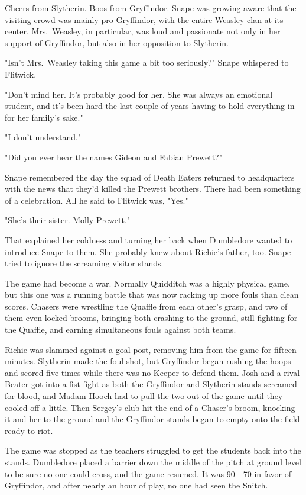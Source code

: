 Cheers from Slytherin. Boos from Gryffindor. Snape was growing aware that the visiting crowd was mainly pro-Gryffindor, with the entire Weasley clan at its center. Mrs.~Weasley, in particular, was loud and passionate not only in her support of Gryffindor, but also in her opposition to Slytherin.

"Isn't Mrs.~Weasley taking this game a bit too seriously?" Snape whispered to Flitwick.

"Don't mind her. It's probably good for her. She was always an emotional student, and it's been hard the last couple of years having to hold everything in for her family's sake."

"I don't understand."

"Did you ever hear the names Gideon and Fabian Prewett?"

Snape remembered the day the squad of Death Eaters returned to headquarters with the news that they'd killed the Prewett brothers. There had been something of a celebration. All he said to Flitwick was, "Yes."

"She's their sister. Molly Prewett."

That explained her coldness and turning her back when Dumbledore wanted to introduce Snape to them. She probably knew about Richie's father, too. Snape tried to ignore the screaming visitor stands.

The game had become a war. Normally Quidditch was a highly physical game, but this one was a running battle that was now racking up more fouls than clean scores. Chasers were wrestling the Quaffle from each other's grasp, and two of them even locked brooms, bringing both crashing to the ground, still fighting for the Quaffle, and earning simultaneous fouls against both teams.

Richie was slammed against a goal post, removing him from the game for fifteen minutes. Slytherin made the foul shot, but Gryffindor began rushing the hoops and scored five times while there was no Keeper to defend them. Josh and a rival Beater got into a fist fight as both the Gryffindor and Slytherin stands screamed for blood, and Madam Hooch had to pull the two out of the game until they cooled off a little. Then Sergey's club hit the end of a Chaser's broom, knocking it and her to the ground and the Gryffindor stands began to empty onto the field ready to riot.

The game was stopped as the teachers struggled to get the students back into the stands. Dumbledore placed a barrier down the middle of the pitch at ground level to be sure no one could cross, and the game resumed. It was 90—70 in favor of Gryffindor, and after nearly an hour of play, no one had seen the Snitch.

